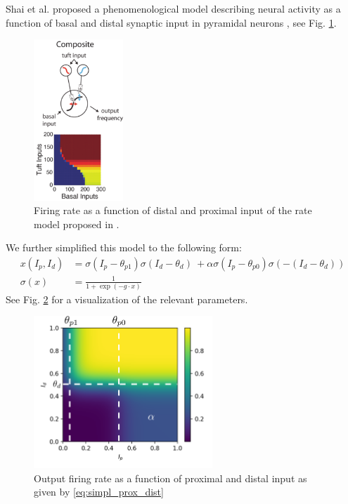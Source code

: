 \documentclass[10pt,a4paper]{article}
\begin{document}
Shai et al. proposed a phenomenological model describing neural activity as a function of basal and distal synaptic input in pyramidal neurons \cite{Shai_2015}, see Fig. \ref{fig:Shai_prox_dist}.
\begin{figure}
\centering
\includegraphics[width=0.3\textwidth]{./figures/shai_phen_model.png}
\caption{Firing rate as a function of distal and proximal input of the rate model proposed in \cite{Shai_2015}.}
\label{fig:Shai_prox_dist}
\end{figure}
We further simplified this model to the following form:
\begin{align}
x\left(I_p,I_d\right) &= \sigma\left(I_p-\theta_{p1}\right) \sigma\left(I_d-\theta_d\right)\ +\alpha\sigma\left(I_p-\theta_{p0}\right)\sigma\left(-\left(I_d-\theta_d\right)\right) \label{eq:simpl_prox_dist} \\
\sigma\left(x\right) &= \frac{1}{1+\exp(-g\cdot x)} \label{eq:sigmoidal}
\end{align}
See Fig. \ref{fig:simpl_prox_dist} for a visualization of the relevant parameters.

\begin{figure}
\centering
\includegraphics[width=0.6\textwidth]{./figures/plot_comp_mod_marks.png}
\caption{Output firing rate as a function of proximal and distal input as given by \eqref{eq:simpl_prox_dist}}
\label{fig:simpl_prox_dist}
\end{figure}
\end{document}
